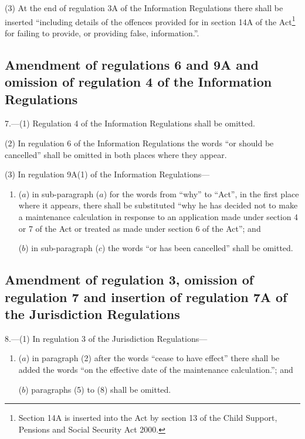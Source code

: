 \documentclass[12pt,a4paper]{article}
\begin{document}
(3) At the end of regulation 3A of the Information Regulations there shall be inserted “including details of the offences provided for in section 14A of the Act\footnote{Section 14A is inserted into the Act by section 13 of the Child Support, Pensions and Social Security Act 2000.} for failing to provide, or providing false, information.”.

\subsection[7. Amendment of regulations 6 and 9A and omission of regulation 4 of the Information Regulations]{Amendment of regulations 6 and 9A and omission of regulation 4 of the Information Regulations}

7.---(1)  Regulation 4 of the Information Regulations shall be omitted.

(2) In regulation 6 of the Information Regulations the words “or should be cancelled” shall be omitted in both places where they appear.

(3) In regulation 9A(1) of the Information Regulations—
\begin{enumerate}\item[]
($a$) in sub-paragraph ($a$)  for the words from “why” to “Act”, in the first place where it appears, there shall be substituted “why he has decided not to make a maintenance calculation in response to an application made under section 4 or 7 of the Act or treated as made under section 6 of the Act”; and

($b$) in sub-paragraph ($c$)  the words “or has been cancelled” shall be omitted.
\end{enumerate}

\subsection[8. Amendment of regulation 3, omission of regulation 7 and insertion of regulation 7A of the Jurisdiction Regulations]{Amendment of regulation 3, omission of regulation 7 and insertion of regulation 7A of the Jurisdiction Regulations}

8.---(1)  In regulation 3 of the Jurisdiction Regulations—
\begin{enumerate}\item[]
($a$) in paragraph (2) after the words “cease to have effect” there shall be added the words “on the effective date of the maintenance calculation.”; and

($b$) paragraphs (5) to (8) shall be omitted.
\end{enumerate}
\end{document}

